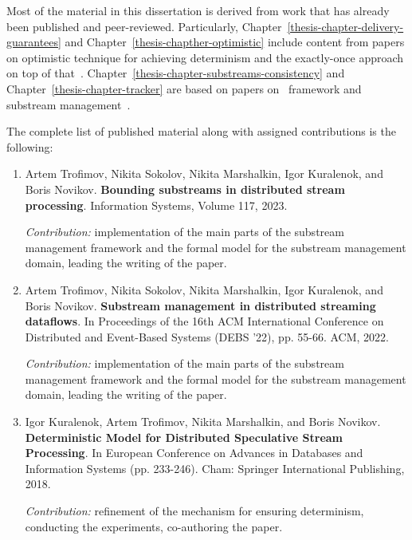 Most of the material in this dissertation is derived from work that has already been published and peer-reviewed. Particularly, Chapter~\ref{thesis-chapter-delivery-guarantees} and Chapter~\ref{thesis-chapther-optimistic} include content from papers on optimistic technique for achieving determinism and the exactly-once approach on top of that~\cite{we2018seim, we2018adbis, thepaper, we2018beyondmr, trofimov2018consistency, webirte, we2019debs}. Chapter~\ref{thesis-chapter-substreams-consistency} and Chapter~\ref{thesis-chapter-tracker} are based on papers on \tracker\ framework and substream management~\cite{10.1145/3524860.3539809, trofimov2023bounding}.

The complete list of published material along with assigned contributions is the following:

\begin{enumerate}
    \item Artem Trofimov, Nikita Sokolov, Nikita Marshalkin, Igor Kuralenok, and Boris Novikov. \textbf{Bounding substreams in distributed stream processing}. Information Systems, Volume 117, 2023. \newline
    
    \textit{Contribution:} implementation of the main parts of the substream management framework and the formal model for the substream management domain, leading the writing of the paper.

    \item Artem Trofimov, Nikita Sokolov, Nikita Marshalkin, Igor Kuralenok, and Boris Novikov. \textbf{Substream management in distributed streaming dataflows}. In Proceedings of the 16th ACM International Conference on Distributed and Event-Based Systems (DEBS '22), pp. 55-66. ACM, 2022. \newline
    
    \textit{Contribution:} implementation of the main parts of the substream management framework and the formal model for the substream management domain, leading the writing of the paper.

    \item Igor Kuralenok, Artem Trofimov, Nikita Marshalkin, and Boris Novikov. \textbf{Deterministic Model for Distributed Speculative Stream Processing}. In European Conference on Advances in Databases and Information Systems (pp. 233-246). Cham: Springer International Publishing, 2018. \newline
    
    \textit{Contribution:} refinement of the mechanism for ensuring determinism, conducting the experiments, co-authoring the paper.


\end{enumerate}
